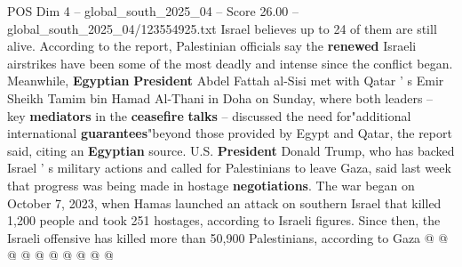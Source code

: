 \begin{textsample}{POS Dim 4 – global\_south\_2025\_04 – Score 26.00 – global\_south\_2025\_04/123554925.txt}
Israel believes up to 24 of them are still alive.
According to the report, Palestinian officials say the \textbf{renewed} Israeli airstrikes have been some of the most deadly and intense since the conflict began.
Meanwhile, \textbf{Egyptian} \textbf{President} Abdel Fattah al-Sisi met with Qatar ' s Emir Sheikh Tamim bin Hamad Al-Thani in Doha on Sunday, where both leaders -- key \textbf{mediators} in the \textbf{ceasefire} \textbf{talks} -- discussed the need for"additional international \textbf{guarantees}"beyond those provided by Egypt and Qatar, the report said, citing an \textbf{Egyptian} source.
U.S. \textbf{President} Donald Trump, who has backed Israel ' s military actions and called for Palestinians to leave Gaza, said last week that progress was being made in hostage \textbf{negotiations}.
The war began on October 7, 2023, when Hamas launched an attack on southern Israel that killed 1,200 people and took 251 hostages, according to Israeli figures.
Since then, the Israeli offensive has killed more than 50,900 Palestinians, according to Gaza @ @ @ @ @ @ @ @ @ @

\end{textsample}

